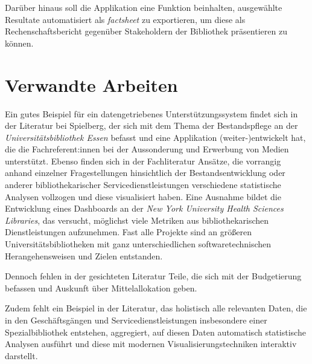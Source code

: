 Darüber hinaus soll die Applikation  eine Funktion beinhalten, ausgewählte
Resultate automatisiert als \textit{factsheet} zu exportieren, um diese
als Rechenschaftsbericht gegenüber Stakeholdern der Bibliothek präsentieren zu können.

\section{Verwandte Arbeiten}


Ein gutes Beispiel für ein datengetriebenes Unterstützungssystem findet sich in
der Literatur bei Spielberg, der sich mit dem Thema der Bestandspflege an der
\textit{Universitätsbibliothek Essen} befasst und eine Applikation (weiter-)entwickelt hat, die
die Fachreferent:innen bei der Aussonderung und Erwerbung von Medien
unterstützt.\cite{spielberg_eike_t_fachref-assistent_nodate}
Ebenso finden sich in der Fachliteratur Ansätze, die vorrangig anhand einzelner
Fragestellungen hinsichtlich der Bestandsentwicklung\cite{hughes_long-term_2016} oder anderer
bibliothekarischer Servicedienstleistungen\cite{kutlay_shiny_2020, knievel_use_2006,meyer_using_2018} verschiedene statistische Analysen
vollzogen und diese visualisiert haben.
Eine Ausnahme bildet die Entwicklung eines Dashboards an der \textit{New York
University Health Sciences Libraries}, das versucht, möglichst viele Metriken
aus bibliothekarischen Dienstleistungen aufzunehmen.\cite{morton-owens_trends_2012}
Fast alle Projekte sind an größeren
Universitätsbibliotheken mit ganz unterschiedlichen softwaretechnischen
Herangehensweisen\cite{finch_using_2016, wiegand_visualizing_2013} und Zielen\cite{phetteplace_effectively_2012} entstanden.

Dennoch fehlen in der gesichteten Literatur Teile, die sich mit der Budgetierung
befassen und Auskunft über Mittelallokation geben.

Zudem fehlt ein Beispiel in der Literatur, das holistisch alle relevanten Daten, die in den
Geschäftsgängen und Servicedienstleistungen insbesondere einer Spezialbibliothek entstehen,
aggregiert, auf diesen Daten automatisch statistische Analysen ausführt und diese mit modernen Visualisierungstechniken
interaktiv darstellt.

